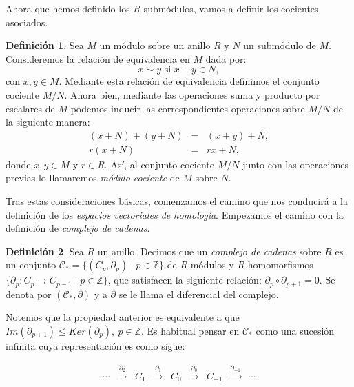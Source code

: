 \documentclass[12pt, a4paper, twoside]{book}
\numberwithin{equation}{section}
\theoremstyle{definition}
\newtheorem{defi}{Definición}[section]
\theoremstyle{remark}
\theoremstyle{plain}
\begin{document}
	Ahora que hemos definido los $R$-submódulos, vamos a definir los 
	cocientes asociados.

	\begin{defi}
		Sea $M$ un módulo sobre un anillo $R$ y $N$ un submódulo de 
		$M$. Consideremos la relación de equivalencia en $M$ dada por:
		$$
		x \sim y \text{ si } x-y \in N,
		$$
		con $x,y \in M$. Mediante esta relación de equivalencia 
		definimos el conjunto cociente $M/N$. Ahora bien, mediante las 
		operaciones suma y producto por escalares de $M$ podemos 
		inducir las correspondientes operaciones sobre $M/N$ de la 
		siguiente manera:
		\begin{equation*}
		\begin{array}{rll}
			(x+N)+(y+N) & = & (x+y)+N,\\
			r(x+N) & = & rx+N,
		\end{array}
		\end{equation*}
		donde $x,y \in M$ y $r \in R$. Así, al conjunto cociente 
		$M/N$ junto con las operaciones previas lo llamaremos 
		\textit{módulo cociente} de $M$ sobre $N$.
	\end{defi}

	Tras estas consideraciones básicas, comenzamos el camino que nos 
	conducirá a la definición de los \emph{espacios vectoriales de 
	homología}. Empezamos el camino con la definición de \emph{complejo de 
	cadenas}.

	\begin{defi}
	Sea $R$ un anillo. Decimos que un \textit{complejo de cadenas} sobre 
	$R$ 
	es un conjunto $\mathcal{C}_{*}=\{(C_{p},\partial_{p}) \mid p \in 
	\mathbb{Z}\}$
	de $R$-módulos y $R$-homomorfismos $\{\partial_{p}\colon C_{p} 
		\rightarrow 
	C_{p-1} \mid p \in \mathbb{Z}\}$, que satisfacen la siguiente 
	relación: $\partial_{p}\circ 
	\partial_{p+1}=0$. Se denota por $(\mathcal{C}_{*},\partial)$ y a 
	$\partial$ se le llama el diferencial del complejo.
	\end{defi}

	Notemos que la propiedad anterior es equivalente a que 
	$Im(\partial_{p+1}) \leq Ker(\partial_{p}),\ p \in \mathbb{Z}$. Es 
	habitual pensar en $\mathcal{C}_{*}$ como una sucesión infinita cuya
	representación es como sigue:

	\begin{equation*}
		 \left.
		\begin{array}{ccccccccc}
			\cdots & \overset{\partial_{2}}{\longrightarrow} & C_{1}& 
			\overset{\partial_{1}}{\longrightarrow} & C_{0} 
					& \overset{\partial_{0}}{\longrightarrow}
			& C_{-1} & 
			\overset{\partial_{-1}}{\longrightarrow} & \cdots 
		\end{array}
		\right. 
	\end{equation*}
\end{document}

